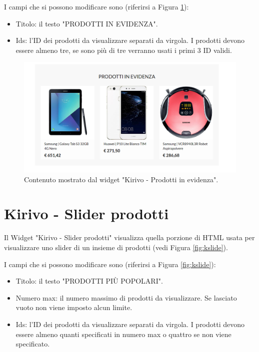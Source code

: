 I campi che si possono modificare sono (riferirsi a Figura \ref{fig:kevid}):
\begin{itemize}
\item Titolo: il testo "PRODOTTI IN EVIDENZA".
\item Ids: l'ID dei prodotti da visualizzare separati da virgola. I prodotti devono
essere almeno tre, se sono più di tre verranno usati i primi 3 ID validi.
\end{itemize}

\begin{figure}
  \includegraphics[width=\textwidth]{figure/kevid.png}
  \caption{Contenuto mostrato dal widget "Kirivo - Prodotti in evidenza".}
  \label{fig:kevid}
\end{figure}

\newpage
\section{Kirivo - Slider prodotti}


Il Widget "Kirivo - Slider prodotti"   visualizza quella porzione di HTML usata
per visualizzare uno slider di un insieme di prodotti (vedi Figura \ref{fig:kslide}).

I campi che si possono modificare sono (riferirsi a Figura \ref{fig:kslide}):
\begin{itemize}
\item Titolo: il testo "PRODOTTI PIÙ POPOLARI".
\item Numero max: il numero massimo di prodotti da visualizzare. Se lasciato vuoto non viene imposto alcun limite.
\item Ids: l'ID dei prodotti da visualizzare separati da virgola. I prodotti devono
essere almeno quanti specificati in numero max o quattro se non viene specificato.
\end{itemize}

